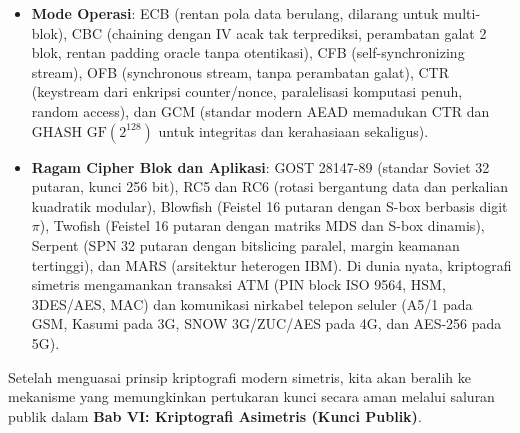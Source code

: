 \documentclass[main.tex]{subfiles}
\begin{document}
\begin{rangkuman}
\begin{itemize}
  \item \textbf{Mode Operasi}: ECB (rentan pola data berulang, dilarang untuk multi-blok), CBC (chaining dengan IV acak tak terprediksi, perambatan galat 2 blok, rentan padding oracle tanpa otentikasi), CFB (self-synchronizing stream), OFB (synchronous stream, tanpa perambatan galat), CTR (keystream dari enkripsi counter/nonce, paralelisasi komputasi penuh, random access), dan GCM (standar modern AEAD memadukan CTR dan GHASH $\mathrm{GF}(2^{128})$ untuk integritas dan kerahasiaan sekaligus).
  \item \textbf{Ragam Cipher Blok dan Aplikasi}: GOST 28147-89 (standar Soviet 32 putaran, kunci 256 bit), RC5 dan RC6 (rotasi bergantung data dan perkalian kuadratik modular), Blowfish (Feistel 16 putaran dengan S-box berbasis digit $\pi$), Twofish (Feistel 16 putaran dengan matriks MDS dan S-box dinamis), Serpent (SPN 32 putaran dengan bitslicing paralel, margin keamanan tertinggi), dan MARS (arsitektur heterogen IBM). Di dunia nyata, kriptografi simetris mengamankan transaksi ATM (PIN block ISO 9564, HSM, 3DES/AES, MAC) dan komunikasi nirkabel telepon seluler (A5/1 pada GSM, Kasumi pada 3G, SNOW 3G/ZUC/AES pada 4G, dan AES-256 pada 5G).
\end{itemize}
\end{rangkuman}

\begin{transition}
Setelah menguasai prinsip kriptografi modern simetris, kita akan beralih ke mekanisme yang memungkinkan pertukaran kunci secara aman melalui saluran publik dalam \textbf{Bab VI: Kriptografi Asimetris (Kunci Publik)}.
\end{transition}

\ifSubfilesClassLoaded{
  \renewcommand{\bibname}{Daftar Pustaka}
  
  
}{}
\end{document}
